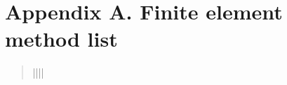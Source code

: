 \documentclass[a4paper,11pt,english]{sphinxmanual}
\begin{document}
\chapter{Appendix A. Finite element method list}
\label{\detokenize{userdoc/appendixA:appendix-a-finite-element-method-list}}\label{\detokenize{userdoc/appendixA:ud-appendixa}}\label{\detokenize{userdoc/appendixA::doc}}\begin{quote}


\begin{savenotes}\sphinxattablestart
\centering
{}
\sphinxthecaptionisattop
{}\label{\detokenize{userdoc/appendixA:id8}}
\sphinxaftertopcaption
\begin{tabular}[t]{||||}
\hline


\end{tabular}
\end{savenotes}
\end{quote}
\end{document}
